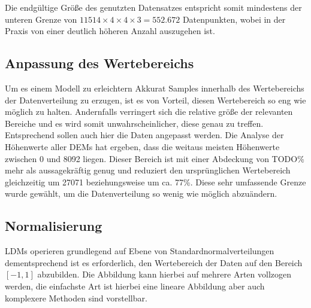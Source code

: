 Die endgültige Größe des genutzten Datensatzes entspricht somit mindestens der unteren Grenze von $11514\times4\times4\times3 = 552.672$ Datenpunkten, wobei in der Praxis von einer deutlich höheren Anzahl auszugehen ist.


\subsection{Anpassung des Wertebereichs}

Um es einem Modell zu erleichtern Akkurat Samples innerhalb des Wertebereichs der Datenverteilung zu erzugen, ist es von Vorteil, diesen Wertebereich so eng wie möglich zu halten. Andernfalls verringert sich die relative größe der relevanten Bereiche und es wird somit unwahrscheinlicher, diese genau zu treffen. Entsprechend sollen auch hier die Daten angepasst werden. 
Die Analyse der Höhenwerte aller DEMs hat ergeben, dass die weitaus meisten Höhenwerte zwischen 0 und 8092 liegen. Dieser Bereich ist mit einer Abdeckung von TODO\% mehr als aussagekräftig genug und reduziert den ursprünglichen Wertebereich gleichzeitig um 27071 beziehungsweise um ca. 77\%. 
Diese sehr umfassende Grenze wurde gewählt, um die Datenverteilung so wenig wie möglich abzuändern. 

\subsection{Normalisierung}

LDMs operieren grundlegend auf Ebene von Standardnormalverteilungen dementsprechend ist es erforderlich, den Wertebereich der Daten auf den Bereich $\left [ -1, 1\right ]$ abzubilden. Die Abbildung kann hierbei auf mehrere Arten vollzogen werden, die einfachste Art ist hierbei eine lineare Abbildung aber auch komplexere Methoden sind vorstellbar. 


